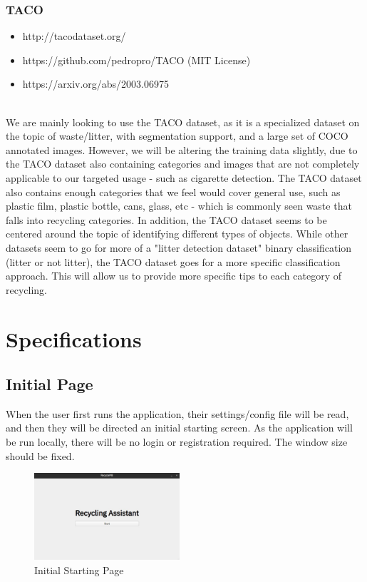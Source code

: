 \documentclass[conference]{IEEEtran}
\begin{document}
\subsubsection{TACO}
\begin{itemize}
\item http://tacodataset.org/
\item https://github.com/pedropro/TACO (MIT License)
\item https://arxiv.org/abs/2003.06975
\end{itemize}~\\
We are mainly looking to use the TACO dataset, as it is a specialized dataset on the topic of waste/litter, with segmentation support, and a large set of COCO annotated images. \newline
However, we will be altering the training data slightly, due to the TACO dataset also containing categories and images that are not completely applicable to our targeted usage - such as cigarette detection.
\newline\newline
The TACO dataset also contains enough categories that we feel would cover general use, such as plastic film, plastic bottle, cans, glass, etc - which is commonly seen waste that falls into recycling categories.
\newline
In addition, the TACO dataset seems to be centered around the topic of identifying different types of objects. While other datasets seem to go for more of a "litter detection dataset" binary classification (litter or not litter), the TACO dataset goes for a more specific classification approach. This will allow us to provide more specific tips to each category of recycling.

\newpage
\section{Specifications}
\subsection{Initial Page}
When the user first runs the application, their settings/config file will be read, and then they will be directed an initial starting screen. As the application will be run locally, there will be no login or registration required. The window size should be fixed. ~\\

\begin{figure}[h]
    \centering
    \includegraphics[width=0.48\textwidth]{images/start.eps}
    \caption{Initial Starting Page}
\end{figure}~\\
\end{document}
